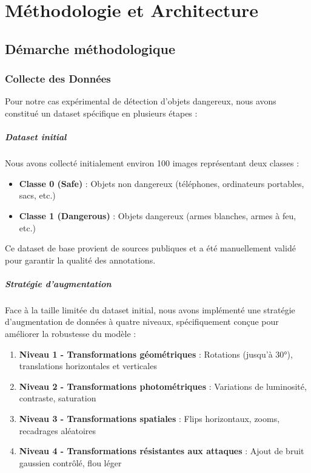 \chapter{Méthodologie et Architecture}

\section{Démarche méthodologique}

\subsection{Collecte des Données}

Pour notre cas expérimental de détection d'objets dangereux, nous avons constitué un dataset spécifique en plusieurs étapes :

\paragraph{Dataset initial}
Nous avons collecté initialement environ 100 images représentant deux classes :
\begin{itemize}
    \item \textbf{Classe 0 (Safe)} : Objets non dangereux (téléphones, ordinateurs portables, sacs, etc.)
    \item \textbf{Classe 1 (Dangerous)} : Objets dangereux (armes blanches, armes à feu, etc.)
\end{itemize}

Ce dataset de base provient de sources publiques et a été manuellement validé pour garantir la qualité des annotations.

\paragraph{Stratégie d'augmentation}
Face à la taille limitée du dataset initial, nous avons implémenté une stratégie d'augmentation de données à quatre niveaux, spécifiquement conçue pour améliorer la robustesse du modèle :

\begin{enumerate}
    \item \textbf{Niveau 1 - Transformations géométriques} : Rotations (jusqu'à 30°), translations horizontales et verticales
    \item \textbf{Niveau 2 - Transformations photométriques} : Variations de luminosité, contraste, saturation
    \item \textbf{Niveau 3 - Transformations spatiales} : Flips horizontaux, zooms, recadrages aléatoires
    \item \textbf{Niveau 4 - Transformations résistantes aux attaques} : Ajout de bruit gaussien contrôlé, flou léger
\end{enumerate}


